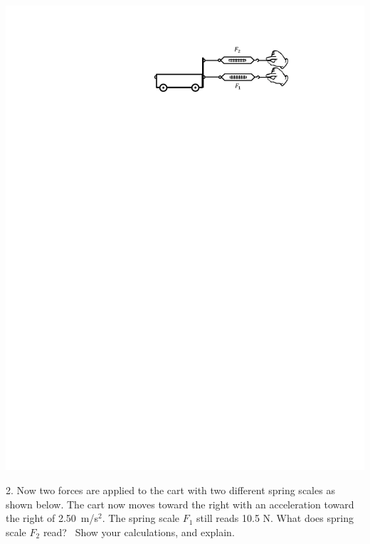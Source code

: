 \includegraphics{force_mass/cart_plus_two_scales_same_side.pdf}


\answerspace{25mm}

2. Now two forces are applied to the cart with two different spring scales as
shown below. The cart now moves toward the right with an acceleration toward the right of
2.50~m/s$^2$. The spring scale \( F_{1} \) still reads 10.5 N. What does spring scale \( F_{2} \) read?~ Show your calculations,
and explain.

